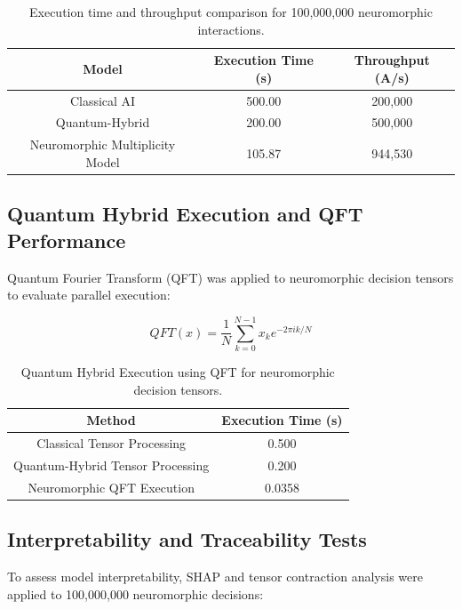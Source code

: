 \documentclass{article}
\theoremstyle{plain}
\begin{document}
\begin{itemize}
\begin{itemize}
\begin{table}[h]
    \centering
    \begin{tabular}{|c|c|c|}
        \hline
        \textbf{Model} & \textbf{Execution Time (s)} & \textbf{Throughput (A/s)} \\
        \hline
        Classical AI & 500.00 & 200,000 \\
        Quantum-Hybrid & 200.00 & 500,000 \\
        Neuromorphic Multiplicity Model & 105.87 & 944,530 \\
        \hline
    \end{tabular}
    \caption{Execution time and throughput comparison for 100,000,000 neuromorphic interactions.}
    \label{tab:throughput_comparison_large}
\end{table}

\subsection{Quantum Hybrid Execution and QFT Performance}

Quantum Fourier Transform (QFT) was applied to neuromorphic decision tensors to evaluate parallel execution:

\begin{equation}
    QFT(x) = \frac{1}{N} \sum_{k=0}^{N-1} x_k e^{-2\pi i k / N}
\end{equation}

\begin{table}[h]
    \centering
    \begin{tabular}{|c|c|}
        \hline
        \textbf{Method} & \textbf{Execution Time (s)} \\
        \hline
        Classical Tensor Processing & 0.500 \\
        Quantum-Hybrid Tensor Processing & 0.200 \\
        Neuromorphic QFT Execution & 0.0358 \\
        \hline
    \end{tabular}
    \caption{Quantum Hybrid Execution using QFT for neuromorphic decision tensors.}
    \label{tab:qft_execution}
\end{table}

\subsection{Interpretability and Traceability Tests}

To assess model interpretability, SHAP and tensor contraction analysis were applied to 100,000,000 neuromorphic decisions:


\end{itemize}
\end{itemize}
\end{document}

